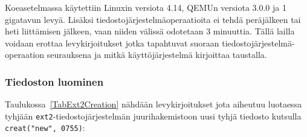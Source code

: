Koeasetelmassa käytettiin Linuxin versiota 4.14, QEMUn versiota 3.0.0 ja 1 gigatavun levyä.
Lisäksi tiedostojärjestelmäoperaatioita ei tehdä peräjälkeen tai heti liittämisen jälkeen,
vaan niiden välissä odotetaan 3 minuuttia.
Tällä lailla voidaan erottaa levykirjoitukset jotka tapahtuvat suoraan tiedostojärjestelmä-operaation seurauksena
ja mitkä käyttöjärjestelmä kirjoittaa taustalla. 

\subsubsection{Tiedoston luominen}
\label{ChapExt2FileCreation}
Taulukossa~\ref{TabExt2Creation} nähdään levykirjoitukset jota aiheutuu luotaessa tyhjään \texttt{ext2}-tiedostojärjestelmän juurihakemistoon uusi tyhjä tiedosto kutsulla \texttt{creat("new", 0755)}:



%

